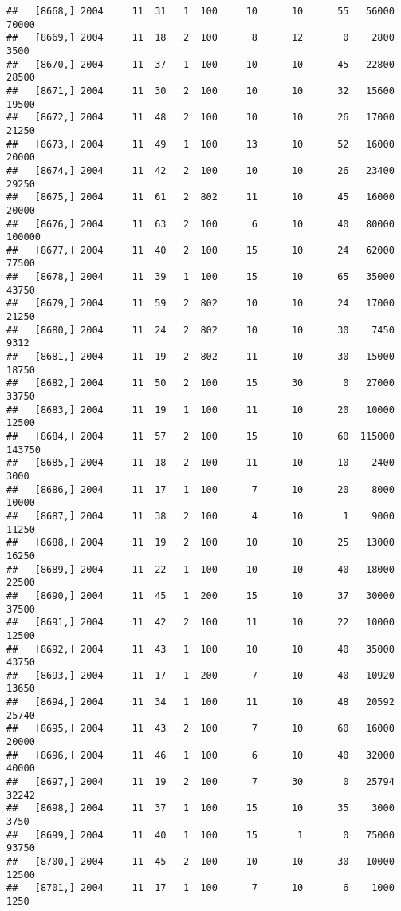 \documentclass{article}\usepackage[]{graphicx}\usepackage[]{color}
\makeatletter
\newenvironment{kframe}{%
 \def\at@end@of@kframe{}%
 \ifinner\ifhmode%
  \def\at@end@of@kframe{\end{minipage}}%
  \begin{minipage}{\columnwidth}%
 \fi\fi%
 \def\FrameCommand##1{\hskip\@totalleftmargin \hskip-\fboxsep
 \colorbox{shadecolor}{##1}\hskip-\fboxsep
     \hskip-\linewidth \hskip-\@totalleftmargin \hskip\columnwidth}%
 \MakeFramed {\advance\hsize-\width
   \@totalleftmargin\z@ \linewidth\hsize
   \@setminipage}}%
 {\par\unskip\endMakeFramed%
 \at@end@of@kframe}
\newenvironment{knitrout}{}{} %
\makeatother
\begin{document}
\begin{knitrout}
\begin{kframe}
\begin{verbatim}
##   [8668,] 2004     11  31   1  100     10      10      55   56000   70000
##   [8669,] 2004     11  18   2  100      8      12       0    2800    3500
##   [8670,] 2004     11  37   1  100     10      10      45   22800   28500
##   [8671,] 2004     11  30   2  100     10      10      32   15600   19500
##   [8672,] 2004     11  48   2  100     10      10      26   17000   21250
##   [8673,] 2004     11  49   1  100     13      10      52   16000   20000
##   [8674,] 2004     11  42   2  100     10      10      26   23400   29250
##   [8675,] 2004     11  61   2  802     11      10      45   16000   20000
##   [8676,] 2004     11  63   2  100      6      10      40   80000  100000
##   [8677,] 2004     11  40   2  100     15      10      24   62000   77500
##   [8678,] 2004     11  39   1  100     15      10      65   35000   43750
##   [8679,] 2004     11  59   2  802     10      10      24   17000   21250
##   [8680,] 2004     11  24   2  802     10      10      30    7450    9312
##   [8681,] 2004     11  19   2  802     11      10      30   15000   18750
##   [8682,] 2004     11  50   2  100     15      30       0   27000   33750
##   [8683,] 2004     11  19   1  100     11      10      20   10000   12500
##   [8684,] 2004     11  57   2  100     15      10      60  115000  143750
##   [8685,] 2004     11  18   2  100     11      10      10    2400    3000
##   [8686,] 2004     11  17   1  100      7      10      20    8000   10000
##   [8687,] 2004     11  38   2  100      4      10       1    9000   11250
##   [8688,] 2004     11  19   2  100     10      10      25   13000   16250
##   [8689,] 2004     11  22   1  100     10      10      40   18000   22500
##   [8690,] 2004     11  45   1  200     15      10      37   30000   37500
##   [8691,] 2004     11  42   2  100     11      10      22   10000   12500
##   [8692,] 2004     11  43   1  100     10      10      40   35000   43750
##   [8693,] 2004     11  17   1  200      7      10      40   10920   13650
##   [8694,] 2004     11  34   1  100     11      10      48   20592   25740
##   [8695,] 2004     11  43   2  100      7      10      60   16000   20000
##   [8696,] 2004     11  46   1  100      6      10      40   32000   40000
##   [8697,] 2004     11  19   2  100      7      30       0   25794   32242
##   [8698,] 2004     11  37   1  100     15      10      35    3000    3750
##   [8699,] 2004     11  40   1  100     15       1       0   75000   93750
##   [8700,] 2004     11  45   2  100     10      10      30   10000   12500
##   [8701,] 2004     11  17   1  100      7      10       6    1000    1250

\end{verbatim}
\end{kframe}
\end{knitrout}
\end{document}
